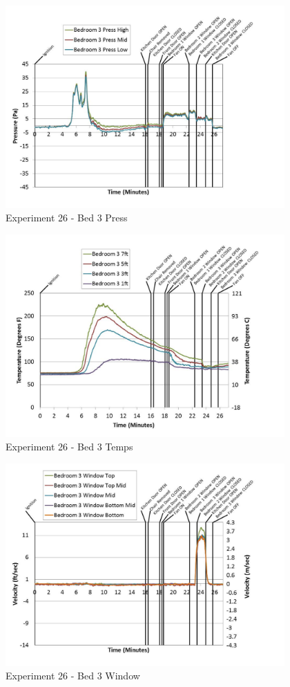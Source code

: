 \documentclass{article}
\begin{document}
\begin{appendices}
	\clearpage

	\begin{figure}[h!]
		\centering
		\includegraphics[height=3.05in]{0_Images/Results_Charts/Exp_26_Charts/Bed3Press.pdf}
		\caption{Experiment 26 - Bed 3 Press}
	\end{figure}
 

	\begin{figure}[h!]
		\centering
		\includegraphics[height=3.05in]{0_Images/Results_Charts/Exp_26_Charts/Bed3Temps.pdf}
		\caption{Experiment 26 - Bed 3 Temps}
	\end{figure}
 
	\clearpage

	\begin{figure}[h!]
		\centering
		\includegraphics[height=3.05in]{0_Images/Results_Charts/Exp_26_Charts/Bed3Window.pdf}
		\caption{Experiment 26 - Bed 3 Window}
	\end{figure}
 


\end{appendices}
\end{document}
